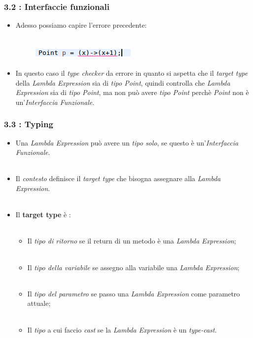\documentclass{beamer}
\begin{document}
\begin{frame}
	\frametitle{\textbf{3.2 : Interfaccie funzionali}}
	\begin{itemize}
		\item
			Adesso possiamo capire l'errore precedente:\\\
			\begin{figure}
				\centering
				\includegraphics[width=0.3\linewidth]{image/target.png}
				\label{fig:target}
			\end{figure}
		\item
			In questo caso il \textit{type checker} da errore in quanto si aspetta che il \textit{target type} della \textit{Lambda Expression} sia di \textit{tipo Point}, quindi controlla che \textit{Lambda Expression} sia di \textit{tipo Point}, ma non può avere \textit{tipo Point} perchè \textit{Point} non è un'\textit{Interfaccia Funzionale}.
	\end{itemize}
\end{frame}


\begin{frame}
	\frametitle{\textbf{3.3 : Typing}}
	\begin{itemize}
		\item
			Una \textit{Lambda Expression} può avere un \textit{tipo solo}, se questo è un'\textit{Interfaccia Funzionale}.\\\
		\item
			Il \textit{contesto} definisce il \textit{target type} che bisogna assegnare alla \textit{Lambda Expression}.\\\
		\item
			Il \textbf{target type} è :\\\
			\begin{itemize}
				\item
					Il \textit{tipo di ritorno} se il return di un metodo è una \textit{Lambda Expression};\\\
				\item
					Il \textit{tipo della variabile} se assegno alla variabile una \textit{Lambda Expression};\\\
				\item
					Il \textit{tipo del parametro} se passo una \textit{Lambda Expression} come parametro attuale;\\\
				\item
					Il \textit{tipo} a cui faccio \textit{cast} se la \textit{Lambda Expression} è un \textit{type-cast}.
			\end{itemize}
	\end{itemize}
\end{frame}
\end{document}
